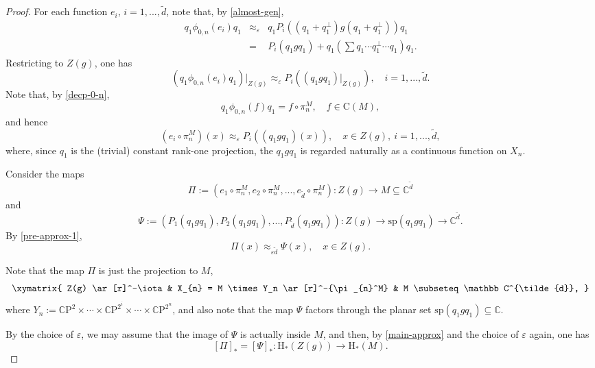 \documentclass[12pt, oneside, psamsfonts]{amsart}
\theoremstyle{definition}
\theoremstyle{remark}
\numberwithin{equation}{section}
\newcommand{\Comp}{\mathbb C}
\newcommand{\eps}{\varepsilon}
\begin{document}
\begin{proof}
For each function $e_i$, $i=1, ..., \tilde{d}$, note that, by \eqref{almost-gen}, 
\begin{eqnarray*}
q_1\phi_{0, n}(e_i) q_1 & \approx_\eps & q_1 P_i((q_1 + q_1^\perp) g (q_1 + q_1^\perp)) q_1 \\
& = & P_i(q_1 g q_1) + q_1(\sum q_1 \cdots q_1^\perp \cdots q_1) q_1.
\end{eqnarray*}
Restricting to $Z(g)$, one has
\begin{equation}\label{pre-approx-0}
(q_1 \phi_{0, n}(e_i) q_1)|_{Z(g)} \approx_\eps P_i((q_1gq_1)|_{Z(g)}), \quad i=1, ..., \tilde{d}.
\end{equation}
Note that, by \eqref{decp-0-n}, 
$$q_1 \phi_{0, n}(f) q_1 = f \circ \pi_{n}^M,\quad f \in \mathrm{C}(M),$$
and hence
\begin{equation}\label{pre-approx-1}
(e_i \circ \pi_{n}^M)(x) \approx_\eps P_i((q_1gq_1)(x)), \quad x \in Z(g),\  i=1, ..., \tilde{d},
\end{equation}
where, since $q_1$ is the (trivial) constant rank-one projection, the $q_1gq_1$ is regarded naturally as a continuous function on $X_{n}$.  

Consider the maps
$$ \Pi:= (e_1\circ\pi_{n}^{M}, e_2 \circ \pi_{n}^M, ... , e_{\tilde{d}} \circ \pi_{n}^M): Z(g) \to  M \subseteq \Comp^{\tilde{d}}$$
and
$$ \Psi:= (P_1(q_1gq_1), P_2(q_1gq_1), ..., P_{\tilde{d}}(q_1gq_1)): Z(g) \to \mathrm{sp}(q_1gq_1) \to  \Comp^{\tilde{d}}. $$
By \eqref{pre-approx-1},
\begin{equation}\label{main-approx}
\Pi(x) \approx_{\eps \tilde{d}} \Psi(x),\quad x \in Z(g).
\end{equation}

Note that the map $\Pi$ is just the projection to $M$,
\begin{equation}\label{large-zero-set}
\xymatrix{
Z(g) \ar[r]^-\iota & X_{n} = M \times Y_n \ar[r]^-{\pi_{n}^M} &  M \subseteq \Comp^{\tilde{d}},
}
\end{equation}
where $Y_n := \mathbb C\mathrm{P}^{2} \times \cdots \times \mathbb C\mathrm{P}^{2^{i}} \times \cdots \times \mathbb C\mathrm{P}^{2^{n}}$,
and also note that the map $\Psi$ factors through the planar set $\mathrm{sp}(q_1gq_1) \subseteq \Comp$.

By the choice of $\eps$, we may assume that the image of $\Psi$ is actually inside $M$, and then, by \eqref{main-approx} and the choice of $\eps$ again, one has
$$[\Pi]_* = [\Psi]_*: \mathrm{H}_*(Z(g)) \to \mathrm{H}_*(M).$$




\end{proof}
\end{document}
